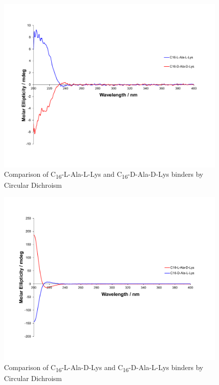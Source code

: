 \begin{figure} [ht!]
\centering
\includegraphics[scale=0.47]{CD/CD-LL_DD.pdf}
\caption{Comparison of C\textsubscript{16}-L-Ala-L-Lys and C\textsubscript{16}-D-Ala-D-Lys binders by Circular Dichroism}
\label{CD-LL_DD}
\end{figure}

\begin{figure} [ht!]
\centering
\includegraphics[scale=0.47]{CD/CD-LD_DL.pdf}
\caption{Comparison of C\textsubscript{16}-L-Ala-D-Lys and C\textsubscript{16}-D-Ala-L-Lys binders by Circular Dichroism}
\label{CD-LD_DL}
\end{figure}


